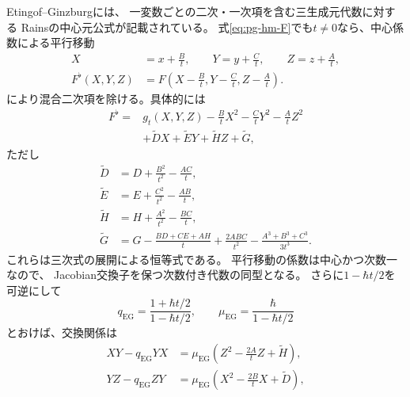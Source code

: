 \begin{remark}
\label{rem:pg-hesse-eg-translation}
Etingof--Ginzburg\cite[\S9, p.~1414]{EG}には、
一変数ごとの二次・一次項を含む三生成元代数に対する
Rainsの中心元公式が記載されている。
式\eqref{eq:pg-hm-F}でも$t\ne0$なら、中心係数による平行移動
\begin{equation}
 \begin{aligned}
 X&=x+\frac Bt,\qquad Y=y+\frac Ct,\qquad Z=z+\frac At,\\
 F^{\flat}(X,Y,Z)
 &=F\left(X-\frac Bt,Y-\frac Ct,Z-\frac At\right).
 \end{aligned}
 \label{eq:pg-hm-eg-coordinates}
\end{equation}
により混合二次項を除ける。具体的には
\begin{equation}
 \begin{aligned}
 F^{\flat}={}&g_t(X,Y,Z)
 -\frac BtX^2-\frac CtY^2-\frac AtZ^2\\
 &+\widetilde D X+\widetilde E Y+\widetilde H Z+\widetilde G,
 \end{aligned}
 \label{eq:pg-hm-eg-polynomial}
\end{equation}
ただし
\begin{equation}
 \begin{aligned}
 \widetilde D&=D+\frac{B^2}{t^2}-\frac{AC}{t},\\
 \widetilde E&=E+\frac{C^2}{t^2}-\frac{AB}{t},\\
 \widetilde H&=H+\frac{A^2}{t^2}-\frac{BC}{t},\\
 \widetilde G&=G-\frac{BD+CE+AH}{t}
 +\frac{2ABC}{t^2}-\frac{A^3+B^3+C^3}{3t^3}.
 \end{aligned}
 \label{eq:pg-hm-eg-coefficients}
\end{equation}
これらは三次式の展開による恒等式である。
平行移動の係数は中心かつ次数一なので、
Jacobian交換子を保つ次数付き代数の同型となる。
さらに$1-\hbar t/2$を可逆にして
\begin{equation}
 q_{\mathrm{EG}}=\frac{1+\hbar t/2}{1-\hbar t/2},\qquad
 \mu_{\mathrm{EG}}=\frac{\hbar}{1-\hbar t/2}
 \label{eq:pg-hm-eg-parameters}
\end{equation}
とおけば、交換関係は
\begin{equation}
 \begin{aligned}
 XY-q_{\mathrm{EG}}YX
 &=\mu_{\mathrm{EG}}\left(Z^2-\frac{2A}{t}Z+\widetilde H\right),\\
 YZ-q_{\mathrm{EG}}ZY
 &=\mu_{\mathrm{EG}}\left(X^2-\frac{2B}{t}X+\widetilde D\right),\\

\end{aligned}
\end{equation}
\end{remark}
